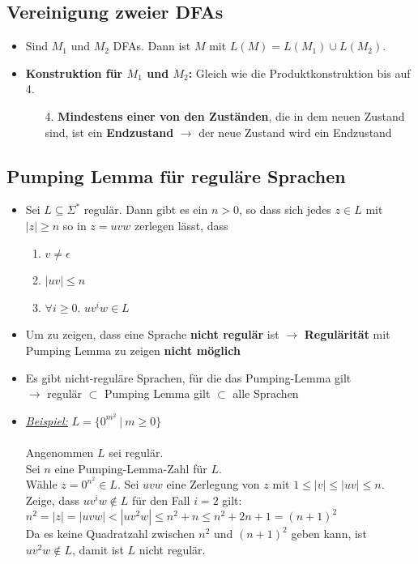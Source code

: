 \documentclass[ieeetran]{article}
\begin{document}
\subsection{Vereinigung zweier DFAs} %
\label{sub:vereinigung_zweier_dFAs}
\begin{itemize}
\item Sind $M_1$ und $M_2$ DFAs. Dann ist $M$ mit $L(M) = L(M_1) \cup L(M_2)$.
\item \textbf{Konstruktion für $M_1$ und $M_2$:}
Gleich wie die Produktkonstruktion bis auf 4.
\begin{enumerate}
	\item[4.] \textbf{Mindestens einer von den Zuständen}, die in dem neuen Zustand sind, ist ein \textbf{Endzustand} $\rightarrow$ der neue Zustand wird ein Endzustand
\end{enumerate}
\end{itemize}

\subsection{Pumping Lemma für reguläre Sprachen} %
\label{sub:pumping_lemma}
\begin{itemize}
	\item Sei $L \subseteq \Sigma^*$ regulär. Dann gibt es ein $n > 0$, so dass sich jedes $z \in L$ mit $|z| \ge n$ so in $z = uvw$ zerlegen lässt, dass
\begin{enumerate}
  \item $v \neq \epsilon$
\item $|uv| \le n$
\item $\forall i \ge 0.$ $uv^iw \in L$
\end{enumerate}
  \item Um zu zeigen, dass eine Sprache \textbf{nicht regulär} ist $\rightarrow$ \textbf{Regulärität} mit Pumping Lemma zu zeigen \textbf{nicht möglich}
  \item Es gibt nicht-reguläre Sprachen, für die das Pumping-Lemma gilt \\$\rightarrow$ regulär $\subset$ Pumping Lemma gilt $\subset$ alle Sprachen

  \item \textit{\underline{Beispiel:}} $L = \{0^{m^{2}} \ | \ m \ge 0\}$
\\ \\ Angenommen $L$ sei regulär.
\\Sei $n$ eine Pumping-Lemma-Zahl für $L$.
\\Wähle $z = 0^{n^{2}} \in L$. Sei $uvw$ eine Zerlegung von $z$ mit $1 \le |v| \le |uv| \le n$.
\\ Zeige, dass $uv^iw \not\in L$ für den Fall $i = 2$ gilt:
\\ $n^2 = |z| = |uvw| < |uv^2w| \le n^2 + n \le n^2 + 2n + 1 = (n + 1)^2$
\\ Da es keine Quadratzahl zwischen $n^2$ und $(n+1)^2$ geben kann, ist $uv^2w \not\in L$, damit ist $L$ nicht regulär.


\end{itemize}
\end{document}
